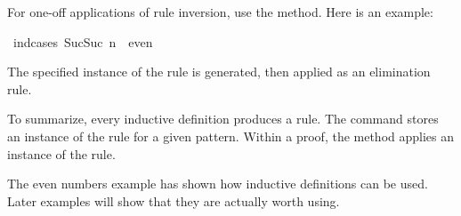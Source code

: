 \begin{isabellebody}
\begin{isamarkuptext}
For one-off applications of rule inversion, use the  method. 
Here is an example:%
\end{isamarkuptext}%
\isamarkuptrue%
%
\isadelimproof
%
\endisadelimproof
%
\isatagproof
{}\isamarkupfalse%
\ {}ind{}cases\ {}Suc{}Suc\ n{}\ {}\ even{}{}%
\endisatagproof
{\isafoldproof}%
%
\isadelimproof
%
\endisadelimproof
%
\begin{isamarkuptext}%
The specified instance of the  rule is generated, then applied
as an elimination rule.

To summarize, every inductive definition produces a  rule.  The
 command stores an instance of the
 rule for a given pattern.  Within a proof, the
 method applies an instance of the 
rule.

The even numbers example has shown how inductive definitions can be
used.  Later examples will show that they are actually worth using.%
%
%
\end{isamarkuptext}%
\isamarkuptrue%
%
\isadelimtheory
%
\endisadelimtheory
%
\isatagtheory
%
\endisatagtheory
{\isafoldtheory}%
%
\isadelimtheory
%
\endisadelimtheory
\end{isabellebody}%
